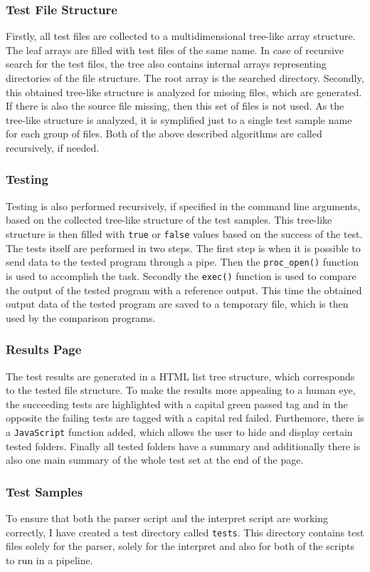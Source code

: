 \documentclass[10pt]{article}
\begin{document}
\subsubsection*{Test File Structure}
Firstly, all test files are collected to a multidimensional tree-like array structure. The leaf arrays are filled with test files of the same name. In case of recursive search for the test files, the tree also contains internal arrays representing directories of the file structure. The root array is the searched directory. Secondly, this obtained tree-like structure is analyzed for missing files, which are generated. If there is also the source file missing, then this set of files is not used. As the tree-like structure is analyzed, it is symplified just to a single test sample name for each group of files. Both of the above described algorithms are called recursively, if needed.

\subsubsection*{Testing}
Testing is also performed recursively, if specified in the command line arguments, based on the collected tree-like structure of the test samples. This tree-like structure is then filled with \texttt{true} or \texttt{false} values based on the success of the test. The tests itself are performed in two steps. The first step is when it is possible to send data to the tested program through a pipe. Then the \texttt{proc\_open()} function is used to accomplish the task. Secondly the \texttt{exec()} function is used to compare the output of the tested program with a reference output. This time the obtained output data of the tested program are saved to a temporary file, which is then used by the comparison programs.

\subsubsection*{Results Page}
The test results are generated in a HTML list tree structure, which corresponds to the tested file structure. To make the results more appealing to a human eye, the succeeding tests are highlighted with a capital green passed tag and in the opposite the failing tests are tagged with a capital red failed. Furthemore, there is a \texttt{JavaScript} function added, which allows the user to hide and display certain tested folders. Finally all tested folders have a summary and additionally there is also one main summary of the whole test set at the end of the page.

\subsubsection*{Test Samples}
To ensure that both the parser script and the interpret script are working correctly, I have created a test directory called \texttt{tests}. This directory contains test files solely for the parser, solely for the interpret and also for both of the scripts to run in a pipeline.
\end{document}
